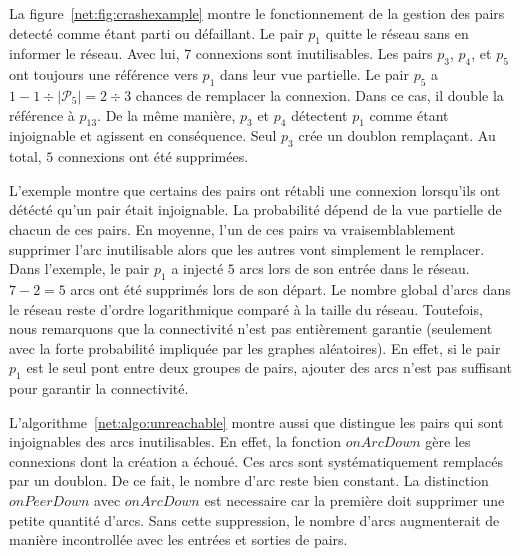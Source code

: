 La figure~\ref{net:fig:crashexample} montre le fonctionnement de la gestion des
pairs detecté comme étant parti ou défaillant. Le pair $p_1$ quitte le réseau
sans en informer le réseau. Avec lui, $7$ connexions sont inutilisables. Les
pairs $p_3$, $p_4$, et $p_5$ ont toujours une référence vers $p_1$ dans leur vue
partielle. Le pair $p_5$ a $1-{1\div{|\mathcal{P}_5|}}={2\div{3}}$ chances de
remplacer la connexion. Dans ce cas, il double la référence à $p_{13}$. De la
même manière, $p_3$ et $p_4$ détectent $p_1$ comme étant injoignable et agissent
en conséquence. Seul $p_3$ crée un doublon remplaçant. Au total, $5$ connexions
ont été supprimées.

L'exemple montre que certains des pairs ont rétabli une connexion lorsqu'ils ont
détécté qu'un pair était injoignable. La probabilité dépend de la vue partielle
de chacun de ces pairs. En moyenne, l'un de ces pairs va vraisemblablement
supprimer l'arc inutilisable alors que les autres vont simplement le
remplacer. Dans l'exemple, le pair $p_1$ a injecté $5$ arcs lors de son entrée
dans le réseau. $7-2 = 5$ arcs ont été supprimés lors de son départ. Le nombre
global d'arcs dans le réseau reste d'ordre logarithmique comparé à la taille du
réseau. Toutefois, nous remarquons que la connectivité n'est pas entièrement
garantie (seulement avec la forte probabilité impliquée par les graphes
aléatoires). En effet, si le pair $p_1$ est le seul pont entre deux groupes de
pairs, ajouter des arcs n'est pas suffisant pour garantir la connectivité.

L'algorithme~\ref{net:algo:unreachable} montre aussi que \SPRAY distingue les
pairs qui sont injoignables des arcs inutilisables. En effet, la fonction
$onArcDown$ gère les connexions dont la création a échoué. Ces arcs sont
systématiquement remplacés par un doublon. De ce fait, le nombre d'arc reste
bien constant. La distinction $onPeerDown$ avec $onArcDown$ est necessaire car
la première doit supprimer une petite quantité d'arcs. Sans cette suppression,
le nombre d'arcs augmenterait de manière incontrollée avec les entrées et
sorties de pairs.

